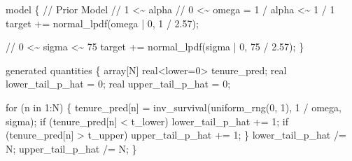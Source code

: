 \documentclass[
  letterpaper,
  DIV=11,
  numbers=noendperiod]{scrartcl}
\newenvironment{Shaded}{\begin{snugshade}}{\end{snugshade}}
\newcommand{\CommentTok}[1]{\textcolor[rgb]{0.37,0.37,0.37}{#1}}
\newcommand{\ControlFlowTok}[1]{\textcolor[rgb]{0.00,0.23,0.31}{#1}}
\newcommand{\DataTypeTok}[1]{\textcolor[rgb]{0.68,0.00,0.00}{#1}}
\newcommand{\DecValTok}[1]{\textcolor[rgb]{0.68,0.00,0.00}{#1}}
\newcommand{\FloatTok}[1]{\textcolor[rgb]{0.68,0.00,0.00}{#1}}
\newcommand{\KeywordTok}[1]{\textcolor[rgb]{0.00,0.23,0.31}{#1}}
\newcommand{\NormalTok}[1]{\textcolor[rgb]{0.00,0.23,0.31}{#1}}
\begin{document}
\begin{codelisting}
\begin{Shaded}
\begin{Highlighting}[]
\KeywordTok{model}\NormalTok{ \{}
  \CommentTok{// Prior Model}
  \CommentTok{// 1 \textless{}\textasciitilde{} alpha}
  \CommentTok{// 0 \textless{}\textasciitilde{} omega = 1 / alpha \textless{}\textasciitilde{} 1 / 1}
  \KeywordTok{target +=}\NormalTok{ normal\_lpdf(omega | }\DecValTok{0}\NormalTok{, }\DecValTok{1}\NormalTok{ / }\FloatTok{2.57}\NormalTok{);}

  \CommentTok{// 0 \textless{}\textasciitilde{} sigma \textless{}\textasciitilde{} 75}
  \KeywordTok{target +=}\NormalTok{ normal\_lpdf(sigma | }\DecValTok{0}\NormalTok{, }\DecValTok{75}\NormalTok{ / }\FloatTok{2.57}\NormalTok{);}
\NormalTok{\}}

\KeywordTok{generated quantities}\NormalTok{ \{}
  \DataTypeTok{array}\NormalTok{[N] }\DataTypeTok{real}\NormalTok{\textless{}}\KeywordTok{lower}\NormalTok{=}\DecValTok{0}\NormalTok{\textgreater{} tenure\_pred;}
  \DataTypeTok{real}\NormalTok{ lower\_tail\_p\_hat = }\DecValTok{0}\NormalTok{;}
  \DataTypeTok{real}\NormalTok{ upper\_tail\_p\_hat = }\DecValTok{0}\NormalTok{;}

  \ControlFlowTok{for}\NormalTok{ (n }\ControlFlowTok{in} \DecValTok{1}\NormalTok{:N) \{}
\NormalTok{    tenure\_pred[n]}
\NormalTok{      = inv\_survival(uniform\_rng(}\DecValTok{0}\NormalTok{, }\DecValTok{1}\NormalTok{), }\DecValTok{1}\NormalTok{ / omega, sigma);}
    \ControlFlowTok{if}\NormalTok{ (tenure\_pred[n] \textless{} t\_lower)}
\NormalTok{      lower\_tail\_p\_hat += }\DecValTok{1}\NormalTok{;}
    \ControlFlowTok{if}\NormalTok{ (tenure\_pred[n] \textgreater{} t\_upper)}
\NormalTok{      upper\_tail\_p\_hat += }\DecValTok{1}\NormalTok{;}
\NormalTok{  \}}
\NormalTok{  lower\_tail\_p\_hat /= N;}
\NormalTok{  upper\_tail\_p\_hat /= N;}
\NormalTok{\}}
\end{Highlighting}
\end{Shaded}

\end{codelisting}
\end{document}
